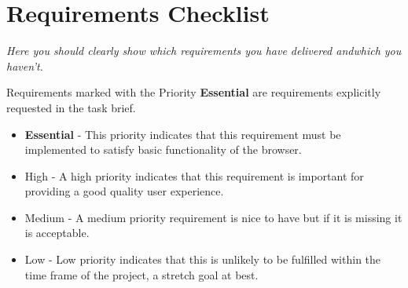 \documentclass[11pt]{article}
\begin{document}
\section{Requirements Checklist}
\emph{Here you should clearly show which requirements you have delivered andwhich you haven’t.}

Requirements marked with the Priority \textbf{Essential} are requirements explicitly requested in the task brief.\\
\linebreak
{}

\begin{itemize}
    \item \textbf{Essential} - This priority indicates that this requirement must be implemented to satisfy basic functionality of the browser.
    \item High - A high priority indicates that this requirement is important for providing a good quality user experience.
    \item Medium - A medium priority requirement is nice to have but if it is missing it is acceptable.
    \item Low - Low priority indicates that this is unlikely to be fulfilled within the time frame of the project, a stretch goal at best.
\end{itemize}
\end{document}
